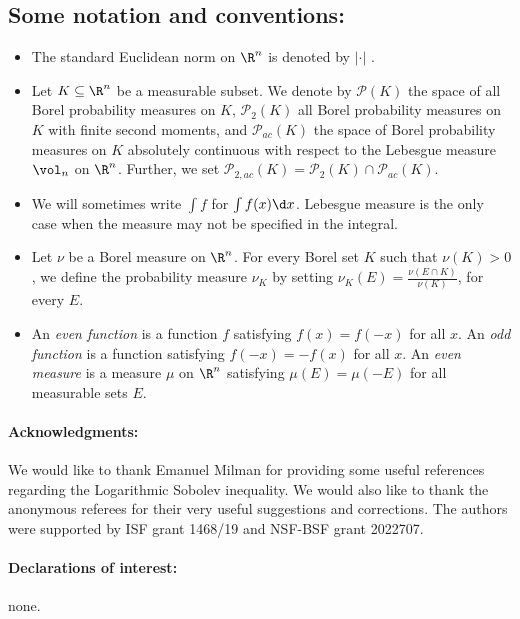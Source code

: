 \subsection*{Some notation and conventions:}
\begin{itemize}
\item The standard Euclidean norm on $\R^n$ is denoted by $\vert \cdot \vert$ .
    \item Let $K \subseteq \R^n$ be a measurable subset. We denote by $\mathcal{P}(K)$ the space of all Borel probability measures on $K$, $\mathcal{P}_{2}(K)$ all Borel probability measures on $K$ with finite second moments, and $\mathcal{P}_{ac}(K)$ the space of Borel probability measures on $K$ absolutely continuous with respect to the Lebesgue measure $\vol_{n}$ on $\R^n$. Further, we set $\mathcal{P}_{2,ac}(K) = \mathcal{P}_{2}(K) \cap \mathcal{P}_{ac}(K)$.
    \item We will sometimes write $\int f$ for $\int f(x) \d x$. Lebesgue measure is the only case when the measure may not be specified in the integral.
    \item Let $\nu$ be a Borel measure on $\R^n$. For every Borel set $K$ such that $\nu(K) >0$, we define the probability measure $\nu_{K}$ by setting $\nu_{K}(E) = \frac{\nu(E \cap K)}{\nu(K)}$, for every $E$. 
    \item An \emph{even function} is a function $f$ satisfying $f(x) = f(-x)$ for all $x$. An \emph{odd function} is a function satisfying $f(-x) = - f(x)$ for all $x$. An \emph{even measure} is a measure $\mu$ on $\R^n$ satisfying $\mu(E) = \mu (-E)$ for all measurable sets $E$. 
\end{itemize}

\paragraph{\textbf{Acknowledgments:}} We would like to thank Emanuel Milman for providing some useful references regarding the Logarithmic Sobolev inequality. We would also like to thank the anonymous referees for their very useful suggestions and corrections. The authors were supported by ISF grant 1468/19 and NSF-BSF grant 2022707.
\paragraph{\textbf{Declarations of interest:}} none.
